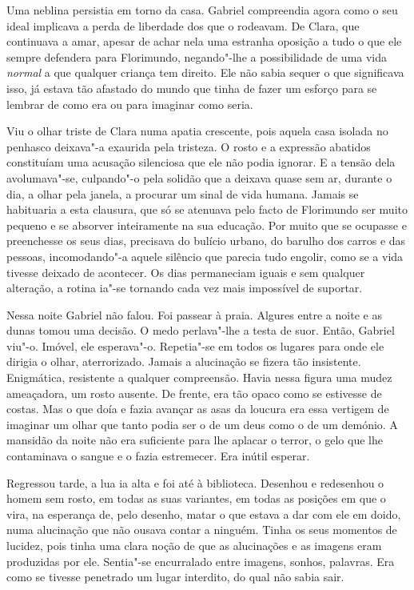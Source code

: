 Uma neblina persistia em torno da casa. Gabriel compreendia agora como o
seu ideal implicava a perda de liberdade dos que o rodeavam. De Clara,
que continuava a amar, apesar de achar nela uma estranha oposição a tudo
o que ele sempre defendera para Florimundo, negando"-lhe a possibilidade
de uma vida \emph{normal} a que qualquer criança tem direito. Ele não sabia
sequer o que significava isso, já estava tão afastado do mundo que tinha
de fazer um esforço para se lembrar de como era ou para imaginar como
seria.

Viu o olhar triste de Clara numa apatia crescente, pois aquela casa
isolada no penhasco deixava"-a exaurida pela tristeza. O rosto e a
expressão abatidos constituíam uma acusação silenciosa que ele não podia
ignorar. E a tensão dela avolumava"-se, culpando"-o pela solidão que a
deixava quase sem ar, durante o dia, a olhar pela janela, a procurar um
sinal de vida humana. Jamais se habituaria a esta clausura, que só se
atenuava pelo facto de Florimundo ser muito pequeno e se absorver
inteiramente na sua educação. Por muito que se ocupasse e preenchesse os
seus dias, precisava do bulício urbano, do barulho dos carros e das
pessoas, incomodando"-a aquele silêncio que parecia tudo engolir, como se
a vida tivesse deixado de acontecer. Os dias permaneciam iguais e sem
qualquer alteração, a rotina ia"-se tornando cada vez mais impossível de
suportar.

Nessa noite Gabriel não falou. Foi passear à praia. Algures entre a
noite e as dunas tomou uma decisão. O medo perlava"-lhe a testa de suor.
Então, Gabriel viu"-o. Imóvel, ele esperava"-o. Repetia"-se em todos os
lugares para onde ele dirigia o olhar, aterrorizado. Jamais a alucinação
se fizera tão insistente. Enigmática, resistente a qualquer compreensão.
Havia nessa figura uma mudez ameaçadora, um rosto ausente. De frente,
era tão opaco como se estivesse de costas. Mas o que doía e fazia
avançar as asas da loucura era essa vertigem de imaginar um olhar que
tanto podia ser o de um deus como o de um demónio. A mansidão da noite
não era suficiente para lhe aplacar o terror, o gelo que lhe contaminava
o sangue e o fazia estremecer. Era inútil esperar.

Regressou tarde, a lua ia alta e foi até à biblioteca. Desenhou e
redesenhou o homem sem rosto, em todas as suas variantes, em todas as
posições em que o vira, na esperança de, pelo desenho, matar o que
estava a dar com ele em doido, numa alucinação que não ousava contar a
ninguém. Tinha os seus momentos de lucidez, pois tinha uma clara noção
de que as alucinações e as imagens eram produzidas por ele. Sentia"-se
encurralado entre imagens, sonhos, palavras. Era como se tivesse
penetrado um lugar interdito, do qual não sabia sair.

